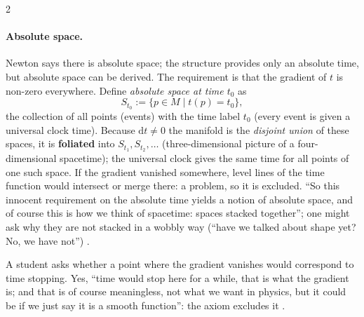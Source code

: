 \begin{paracol}{2}
\paragraph{Absolute space.} Newton says there is absolute space; the structure provides only an absolute time, but absolute space can be derived. The requirement is that the gradient of $t$ is non-zero everywhere. Define \emph{absolute space at time $t_0$} as
\[
  S_{t_0}:=\{p\in M\mid t(p)=t_0\},
\]
the collection of all points (events) with the time label $t_0$ (every event is given a universal clock time). Because $\mathrm dt\neq0$ the manifold is the \emph{disjoint union} of these spaces, it is \textbf{foliated} into $S_{t_1},S_{t_2},\dots$ (three-dimensional picture of a four-dimensional spacetime); the universal clock gives the same time for all points of one such space. If the gradient vanished somewhere, level lines of the time function would intersect or merge there: a problem, so it is excluded. ``So this innocent requirement on the absolute time yields a notion of absolute space, and of course this is how we think of spacetime: spaces stacked together''; one might ask why they are not stacked in a wobbly way (``have we talked about shape yet? No, we have not'')
.
\begin{coursenote}
A student asks whether a point where the gradient vanishes would correspond to time stopping. Yes, ``time would stop here for a while, that is what the gradient is; and that is of course meaningless, not what we want in physics, but it could be if we just say it is a smooth function'': the axiom excludes it .
\end{coursenote}


\end{paracol}
